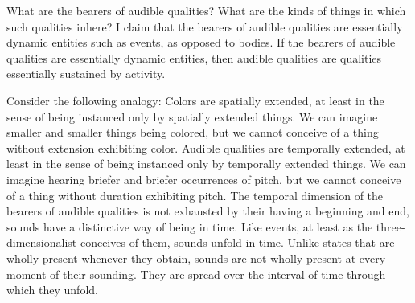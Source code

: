 \documentclass[12pt]{article}
\begin{document}
What are the bearers of audible qualities? What are the kinds of things in which such qualities inhere? I claim that the bearers of audible qualities are essentially dynamic entities such as events, as opposed to bodies. If the bearers of audible qualities are essentially dynamic entities, then audible qualities are qualities essentially sustained by activity.

Consider the following analogy: Colors are spatially extended, at least in the sense of being instanced only by spatially extended things. We can imagine smaller and smaller things being colored, but we cannot conceive of a thing without extension exhibiting color. Audible qualities are temporally extended, at least in the sense of being instanced only by temporally extended things. We can imagine hearing briefer and briefer occurrences of pitch, but we cannot conceive of a thing without duration exhibiting pitch. The temporal dimension of the bearers of audible qualities is not exhausted by their having a beginning and end, sounds have a distinctive way of being in time. Like events, at least as the three-dimensionalist conceives of them, sounds unfold in time. Unlike states that are wholly present whenever they obtain, sounds are not wholly present at every moment of their sounding. They are spread over the interval of time through which they unfold.

\end{document}
